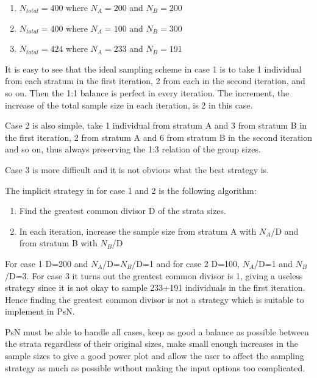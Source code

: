 \begin{enumerate}
	\item $N_{total}=400$ where $N_A=200$ and $N_B=200$
	\item $N_{total}=400$ where $N_A=100$ and $N_B=300$
	\item	$N_{total}=424$ where $N_A=233$ and $N_B=191$
\end{enumerate}
It is easy to see that the ideal sampling scheme in case 1 is to take 1 individual from each stratum in the first iteration, 2 from each in the second iteration, and so on. Then the 1:1 balance is perfect in every iteration. The increment, the increase of the total sample size in each iteration, is 2 in this case.

Case 2 is also simple, take 1 individual from stratum A and 3 from stratum B in the first iteration, 2 from stratum A and 6 from stratum B in the second iteration and so on, thus always preserving the 1:3 relation of the group sizes. 

Case 3 is more difficult and it is not obvious what the best strategy is. 

The implicit strategy in for case 1 and 2 is the following algorithm: 

\begin{enumerate}
	\item Find the greatest common divisor D of the strata sizes.
	\item In each iteration, increase the sample size from stratum A with $N_A$/D and from stratum B with $N_B$/D
\end{enumerate}
For case 1 D=200 and $N_A$/D=$N_B$/D=1 and for case 2 D=100, $N_A$/D=1 and $N_B$/D=3. For case 3 it turns out the greatest common divisor is 1, giving a useless strategy since it is not okay to sample 233+191 individuals in the first iteration. Hence finding the greatest common divisor is not a strategy which is suitable to implement in PsN.

PsN must be able to handle all cases, keep as good a balance as possible between the strata regardless of their original sizes, make small enough increases in the sample sizes to give a good power plot and allow the user to affect the sampling strategy as much as possible without making the input options too complicated.

